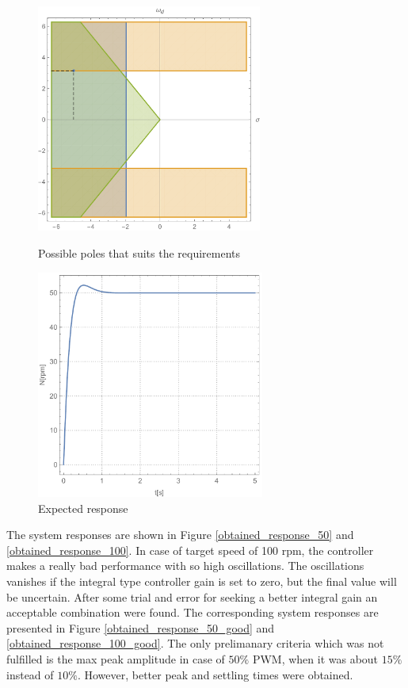 \documentclass[12pt,english]{article}
\begin{document}
\begin{figure}[htb!]
	\centering
	\centering
	\includegraphics[height=7.5cm]{figures/polemap_at_50}
	\caption{Possible poles that suits the requirements}
	\label{polemap_at_50}
	\endminipage\hfill
	\centering
	\includegraphics[height=7.5cm]{figures/expected_50}
	\caption{Expected response}
	\label{expected_response_50}
	\endminipage\hfill
\end{figure}
The system responses are shown in Figure \ref{obtained_response_50} and \ref{obtained_response_100}. In case of target speed of 100 rpm, the controller makes a really bad performance with so high oscillations. The oscillations vanishes if the integral type controller gain is set to zero, but the final value will be uncertain. After some trial and error for seeking a better integral gain an acceptable combination were found. The corresponding system responses are presented in Figure  \ref{obtained_response_50_good} and \ref{obtained_response_100_good}. The only prelimanary criteria which was not fulfilled is the max peak amplitude in case of $50\%$ PWM, when it was about $15\%$ instead of $10\%$. However, better peak and settling times were obtained.
\end{document}
